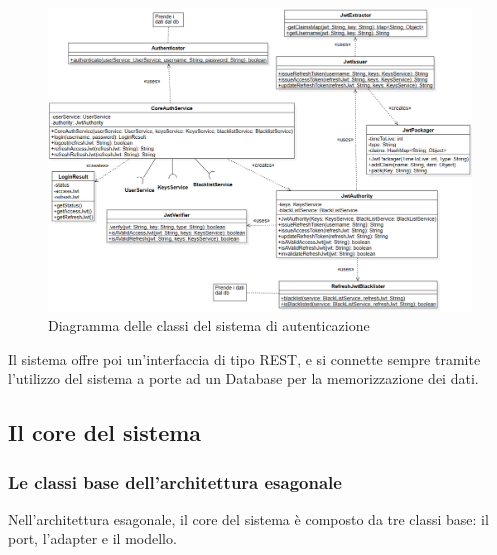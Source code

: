 \begin{figure}[H]
    \centering
    \includegraphics[width=\textwidth]{img/classi_auth.png}
    \caption{Diagramma delle classi del sistema di autenticazione}
\end{figure}

Il sistema offre poi un'interfaccia di tipo REST, e si connette sempre tramite l'utilizzo del sistema a porte ad un Database per la memorizzazione dei dati.

\subsection{Il core del sistema}

\subsubsection{Le classi base dell'architettura esagonale}

Nell'architettura esagonale, il core del sistema è composto da tre classi base: il port, l'adapter e il modello.

